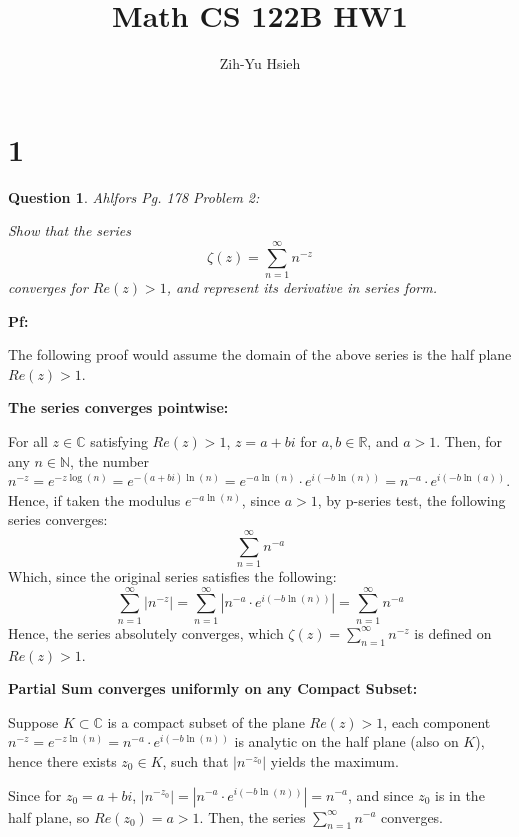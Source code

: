 \documentclass{article}
\title{Math CS 122B HW1}
\author{Zih-Yu Hsieh}
\newtheorem{question}{Question}
\begin{document}
\maketitle

\section*{1}
\begin{myBox}[]{}
    \begin{question}
        Ahlfors Pg. 178 Problem 2:

        Show that the series
        $$\zeta(z)=\sum_{n=1}^{\infty}n^{-z}$$
        converges for $Re(z)>1$, and represent its derivative in series form.
    \end{question}
\end{myBox}

\textbf{Pf:}

The following proof would assume the domain of the above series is the half plane $Re(z)>1$.

\hfil

\textbf{The series converges pointwise:}

For all $z\in\mathbb{C}$ satisfying $Re(z)>1$, $z=a+bi$ for $a,b\in\mathbb{R}$, and $a>1$. Then, for any $n\in\mathbb{N}$,
the number $n^{-z}=e^{-z\log(n)} = e^{-(a+bi)\ln(n)} = e^{-a\ln(n)}\cdot e^{i(-b\ln(n))} = n^{-a}\cdot e^{i(-b\ln(a))}$. Hence, if taken the modulus $e^{-a\ln(n)}$,
since $a>1$, by p-series test, the following series converges:
$$\sum_{n=1}^{\infty}n^{-a}$$
Which, since the original series satisfies the following:
$$\sum_{n=1}^{\infty}|n^{-z}| = \sum_{n=1}^{\infty}\left|n^{-a}\cdot e^{i(-b\ln(n))}\right| = \sum_{n=1}^{\infty}n^{-a}$$
Hence, the series absolutely converges, which $\zeta(z)=\sum_{n=1}^{\infty}n^{-z}$ is defined on $Re(z)>1$.

\hfil

\textbf{Partial Sum converges uniformly on any Compact Subset:}

Suppose $K\subset \mathbb{C}$ is a compact subset of the plane $Re(z)>1$, each component $n^{-z}=e^{-z\ln(n)}=n^{-a}\cdot e^{i(-b\ln(n))}$ is analytic on the half plane (also on $K$), 
hence there exists $z_0\in K$, such that $|n^{-z_0}|$ yields the maximum.

Since for $z_0=a+bi$, $|n^{-z_0}|=\left|n^{-a}\cdot e^{i(-b\ln(n))}\right|=n^{-a}$, and since $z_0$ is in the half plane, so $Re(z_0)=a>1$. Then, the series $\sum_{n=1}^{\infty}n^{-a}$ converges.
\end{document}
